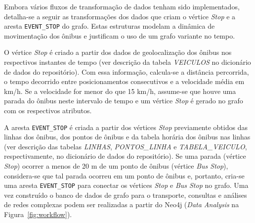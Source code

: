 Embora vários fluxos de transformação de dados tenham sido implementados, detalha-se a seguir as transformações dos dados que criam o vértice \emph{Stop} e a aresta \texttt{EVENT\_STOP} do grafo. Estas estruturas modelam a dinâmica de movimentação dos ônibus e justificam o uso de um grafo variante no tempo.


O vértice \emph{Stop} é criado a partir dos dados de geolocalização dos ônibus nos respectivos instantes de tempo (ver descrição da tabela \emph{VEICULOS} no dicionário de dados do repositório). Com essa informação, calcula-se a distância percorrida, o tempo decorrido entre posicionamentos consecutivos e a velocidade média em km/h. Se a velocidade for menor do que 15 km/h, assume-se que houve uma parada do ônibus neste intervalo de tempo e um vértice \emph{Stop} é gerado no grafo com os respectivos atributos.


A aresta \texttt{EVENT\_STOP} é criada a partir dos vértices \emph{Stop} previamente obtidos das linhas dos ônibus, dos pontos de ônibus e da tabela horária dos ônibus nas linhas (ver descrição das tabelas \emph{LINHAS}, \emph{PONTOS\_LINHA} e \emph{TABELA\_VEICULO}, respectivamente, no dicionário de dados do repositório). Se uma parada (vértice \emph{Stop}) ocorrer a menos de 20 m de um ponto de ônibus (vértice \emph{Bus Stop}), considera-se que tal parada ocorreu em um ponto de ônibus e, portanto, cria-se uma aresta \texttt{EVENT\_STOP} para conectar os vértices \emph{Stop} e \emph{Bus Stop} no grafo.
Uma vez construído o banco de dados de grafo para o transporte, consultas e análises de redes complexas podem ser realizadas a partir do Neo4j (\emph{Data Analysis} na Figura~\ref{fig:workflow}).
 

